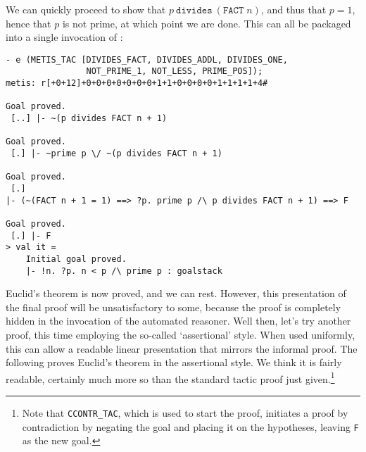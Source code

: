 We can quickly proceed to show that $p \ \mathtt{divides}\ (\mathtt{FACT}\; n)$,
and thus that $p = 1$, hence that $p$ is not prime, at which point we are done.
This can all be packaged into a single invocation of :
\begin{session}
\begin{verbatim}
- e (METIS_TAC [DIVIDES_FACT, DIVIDES_ADDL, DIVIDES_ONE,
                NOT_PRIME_1, NOT_LESS, PRIME_POS]);
metis: r[+0+12]+0+0+0+0+0+0+0+1+1+0+0+0+0+1+1+1+1+4#

Goal proved.
 [..] |- ~(p divides FACT n + 1)

Goal proved.
 [.] |- ~prime p \/ ~(p divides FACT n + 1)

Goal proved.
 [.]
|- (~(FACT n + 1 = 1) ==> ?p. prime p /\ p divides FACT n + 1) ==> F

Goal proved.
 [.] |- F
> val it =
    Initial goal proved.
    |- !n. ?p. n < p /\ prime p : goalstack
\end{verbatim}
\end{session}
    Euclid's theorem is now proved, and we can rest. However, this
    presentation of the final proof will be unsatisfactory to some,
    because the proof is completely hidden in the invocation of the
    automated reasoner. Well then, let's try another proof, this time
    employing the so-called `assertional' style. When used uniformly,
    this can allow a readable linear presentation that mirrors the
    informal proof. The following proves Euclid's theorem in the
    assertional style. We think it is fairly readable, certainly much
    more so than the standard tactic proof just given.\footnote{Note
      that {\tt CCONTR\_TAC}, which is used to start the proof,
      initiates a proof by contradiction by negating the goal and
      placing it on the hypotheses, leaving {\tt F} as the new goal.}

